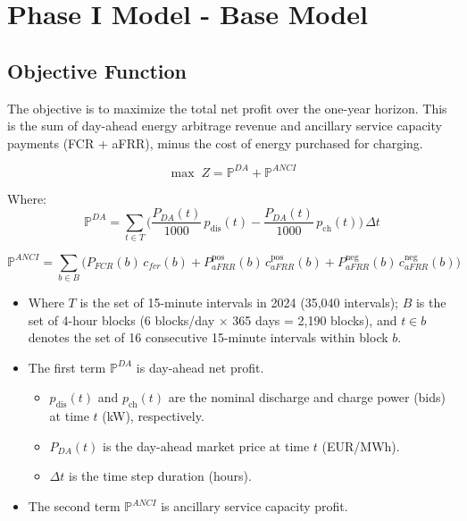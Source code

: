 \documentclass[11pt, a4paper]{article}
\begin{document}
\section{Phase I Model - Base Model}

\subsection*{Objective Function}

The objective is to maximize the total net profit over the one-year horizon. This is the sum of day-ahead energy arbitrage revenue and ancillary service capacity payments (FCR + aFRR), minus the cost of energy purchased for charging.

\begin{equation}
\max \; Z = \mathbb{P}^{DA} + \mathbb{P}^{ANCI}  
\end{equation}

Where:
\begin{equation}
\mathbb{P}^{DA} = \sum_{t\in T} \Bigg( \frac{P_{DA}(t)}{1000}\, p_{\mathrm{dis}}(t) - \frac{P_{DA}(t)}{1000}\, p_{\mathrm{ch}}(t) \Bigg)\, \Delta t    
\end{equation}

\begin{equation}
\mathbb{P}^{ANCI} = \sum_{b\in B} \Big( P_{FCR}(b)\, c_{fcr}(b) + P^{\mathrm{pos}}_{aFRR}(b)\, c^{\mathrm{pos}}_{aFRR}(b) + P^{\mathrm{neg}}_{aFRR}(b)\, c^{\mathrm{neg}}_{aFRR}(b) \Big)\, 
\end{equation}

\begin{itemize}
  \item Where $T$ is the set of 15-minute intervals in 2024 (35,040 intervals); $B$ is the set of 4-hour blocks (6 blocks/day $\times$ 365 days = 2,190 blocks), and $t \in b$ denotes the set of 16 consecutive 15-minute intervals within block $b$.
  \item The first term $\mathbb{P}^{DA}$ is day-ahead net profit.
  \begin{itemize}
    \item $p_{\mathrm{dis}}(t)$ and $p_{\mathrm{ch}}(t)$ are the nominal discharge and charge power (bids) at time $t$ (kW), respectively.
    \item $P_{DA}(t)$ is the day-ahead market price at time $t$ (EUR/MWh).
    \item $\Delta t$ is the time step duration (hours).
  \end{itemize}
  \item The second term $\mathbb{P}^{ANCI}$ is ancillary service capacity profit.
  \begin{itemize}
  \end{itemize}
\end{itemize}
\end{document}
